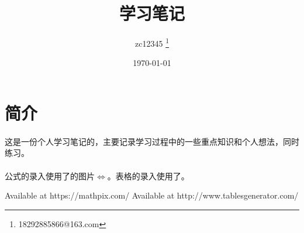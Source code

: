 \documentclass[UTF8]{ctexart}
\title{学习笔记}
\author{zc12345 \thanks{18292885866@163.com}}
\date\today
\begin{document}
\begin{titlepage}
\maketitle
\end{titlepage}

\tableofcontents


\section{简介}
\paragraph{}
这是一份个人学习笔记的，主要记录学习过程中的一些重点知识和个人想法，同时练习。
\paragraph{}
公式的录入使用了\cite{mathpix}的图片$\Leftrightarrow$。表格的录入使用了\cite{tablesgenerator}。




\begin{comment}
don't show in text
\end{comment}

\renewcommand\refname{参考文献}
\begin{thebibliography}{99}
     Available at https://mathpix.com/
      Available at http://www.tablesgenerator.com/
\end{thebibliography}

\end{document}
